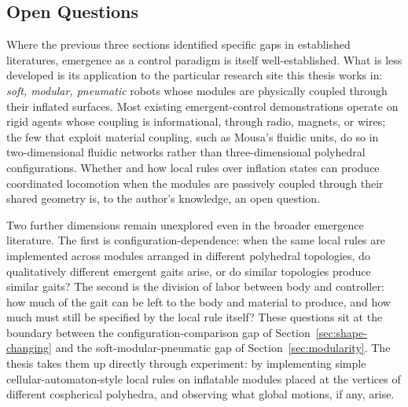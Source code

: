 \subsection{Open Questions}
\label{subsec:emergence-gap}

Where the previous three sections identified specific gaps in established literatures, emergence as a control paradigm is itself well-established. What is less developed is its application to the particular research site this thesis works in: \textit{soft, modular, pneumatic} robots whose modules are physically coupled through their inflated surfaces. Most existing emergent-control demonstrations operate on rigid agents whose coupling is informational, through radio, magnets, or wires; the few that exploit material coupling, such as Mousa's fluidic units, do so in two-dimensional fluidic networks rather than three-dimensional polyhedral configurations. Whether and how local rules over inflation states can produce coordinated locomotion when the modules are passively coupled through their shared geometry is, to the author's knowledge, an open question.

Two further dimensions remain unexplored even in the broader emergence literature. The first is configuration-dependence: when the same local rules are implemented across modules arranged in different polyhedral topologies, do qualitatively different emergent gaits arise, or do similar topologies produce similar gaits? The second is the division of labor between body and controller: how much of the gait can be left to the body and material to produce, and how much must still be specified by the local rule itself? These questions sit at the boundary between the configuration-comparison gap of Section~\ref{sec:shape-changing} and the soft-modular-pneumatic gap of Section~\ref{sec:modularity}. The thesis takes them up directly through experiment: by implementing simple cellular-automaton-style local rules on inflatable modules placed at the vertices of different cospherical polyhedra, and observing what global motions, if any, arise.
